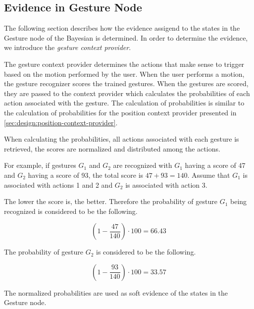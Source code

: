 \subsection{Evidence in Gesture Node}
\label{sec:design:bayesian-network:pgesture-node-evidence}

The following section describes how the evidence assigend to the states in the Gesture node of the Bayesian is determined. In order to determine the evidence, we introduce the \emph{gesture context provider}.

The gesture context provider determines the actions that make sense to trigger based on the motion performed by the user. When the user performs a motion, the gesture recognizer scores the trained gestures. When the gestures are scored, they are passed to the context provider which calculates the probabilities of each action associated with the gesture. The calculation of probabilities is similar to the calculation of probabilities for the position context provider presented in \cref{sec:design:position-context-provider}.

When calculating the probabilities, all actions associated with each gesture is retrieved, the scores are normalized and distributed among the actions.

For example, if gestures $G_1$ and $G_2$ are recognized with $G_1$ having a score of 47 and $G_2$ having a score of 93, the total score is $47 + 93 = 140$. Assume that $G_1$ is associated with actions 1 and 2 and $G_2$ is associated with action 3.

The lower the score is, the better. Therefore the probability of gesture $G_1$ being recognized is considered to be the following.

\begin{equation*}
(1 - \frac{47}{140}) \cdot 100 = 66.43
\end{equation*}

The probability of gesture $G_2$ is considered to be the following.

\begin{equation*}
(1 - \frac{93}{140}) \cdot 100 = 33.57
\end{equation*}

The normalized probabilities are used as soft evidence of the states in the Gesture node.


